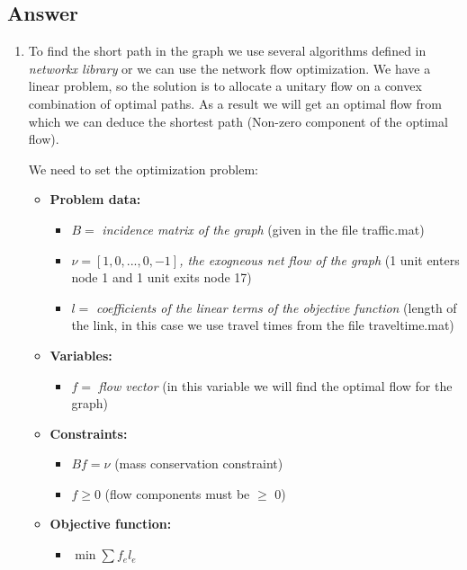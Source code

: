 \documentclass[
	12pt, %
]{fphw}
\begin{document}
\subsection*{Answer} 
\begin{enumerate}[{\bfseries (a)}]
    \item To find the short path in the graph we use several algorithms defined in \emph{networkx library} or we can use the network flow optimization.
    We have a linear problem, so the solution is to allocate a unitary flow on a convex combination of optimal paths. As a result we will get an optimal flow from which we can deduce the shortest path (Non-zero component of the optimal flow). 
    
    We need to set the optimization problem:
    \begin{itemize}
        \item \textbf{Problem data:} 
        \begin{itemize}
            \item $B =$ \emph{incidence matrix of the graph }(given in the file traffic.mat)
            \item $\nu = [1, 0, ..., 0, -1]$\emph{, the exogneous net flow of the graph} (1 unit enters node 1 and 1 unit exits node 17)
            \item $l =$ \emph{coefficients of the linear terms of the objective function} (length of the link, in this case we use travel times from the file traveltime.mat)
        \end{itemize}
        \item \textbf{Variables:}
        \begin{itemize}
            \item $f =$ \emph{flow vector} (in this variable we will find the optimal flow for the graph)
        \end{itemize}
        \item \textbf{Constraints:}
        \begin{itemize}
            \item $Bf = \nu$ (mass conservation constraint)
            \item $f \geq 0$ (flow components must be $\geq$ 0)
        \end{itemize}
        \item \textbf{Objective function:}
        \begin{itemize}
            \item $\min \sum f_e l_e$
        \end{itemize}

\end{itemize}
\end{enumerate}
\end{document}
